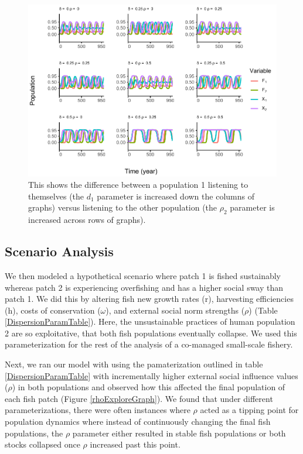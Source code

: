 \documentclass[
  12pt,
]{article}
\begin{document}
\begin{figure}
\centering
\includegraphics{Wulfing_CH2_Draft4_files/figure-latex/influenceAsym-1.pdf}
\caption{\label{fig:influenceAsym}This shows the difference between a population 1 listening to themselves (the \(d_1\) parameter is increased down the columns of graphs) versus listening to the other population (the \(\rho_2\) parameter is increased across rows of graphs). \label{influenceAsym}}
\end{figure}

\hypertarget{scenario-analysis}{%
\subsection{Scenario Analysis}\label{scenario-analysis}}

We then modeled a hypothetical scenario where patch 1 is fished sustainably whereas patch 2 is experiencing overfishing and has a higher social sway than patch 1. We did this by altering fish new growth rates (r), harvesting efficiencies (h), costs of conservation (\(\omega\)), and external social norm strengths (\(\rho\)) (Table \ref{DispersionParamTable}). Here, the unsustainable practices of human population 2 are so exploitative, that both fish populations eventually collapse. We used this parameterization for the rest of the analysis of a co-managed small-scale fishery.



Next, we ran our model with using the pamaterization outlined in table \ref{DispersionParamTable} with incrementally higher external social influence values (\(\rho\)) in both populations and observed how this affected the final population of each fish patch (Figure \ref{rhoExploreGraph}). We found that under different parameterizations, there were often instances where \(\rho\) acted as a tipping point for population dynamics where instead of continuously changing the final fish populations, the \(\rho\) parameter either resulted in stable fish populations or both stocks collapsed once \(\rho\) increased past this point.
\end{document}
